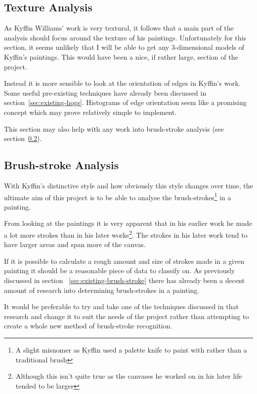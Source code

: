 \subsection{Texture Analysis}
As Kyffin Williams' work is very textural, it follows that a main part of the analysis should
focus around the texture of his paintings. Unfortunately for this section, it seems unlikely that
I will be able to get any 3-dimensional models of Kyffin's paintings. This would have been a nice,
if rather large, section of the project.

Instead it is more sensible to look at the orientation of edges in Kyffin's work. Some useful 
pre-existing techniques have already been discussed in section~\ref{sec:existing-hogs}. Histograms
of edge orientation\cite{Dalal2005Histograms} seem like a promising concept which may prove 
relatively simple to implement.

This section may also help with any work into brush-stroke analysis (see 
section~\ref{sec:analysis-brush-stroke}).

\subsection{Brush-stroke Analysis}\label{sec:analysis-brush-stroke}
With Kyffin's distinctive style and how obviously this style changes over time, the ultimate aim 
of this project is to be able to analyse the brush-strokes\footnote{A slight misnomer as Kyffin 
used a palette knife to paint with rather than a traditional brush} in a painting.

From looking at the paintings it is very apparent that in his earlier work he made a lot more 
strokes than in his later works\footnote{Although this isn't quite true as the canvases he worked
on in his later life tended to be larger}. The strokes in his later work tend to have larger areas
and span more of the canvas.

If it is possible to calculate a rough amount and size of strokes made in a given painting it 
should be a reasonable piece of data to classify on. As previously discussed in section~
\ref{sec:existing-brush-stroke} there has already been a decent amount of research into determining
brush-strokes in a painting. 

It would be preferable to try and take one of the techniques discussed in that research and change
it to suit the needs of the project rather than attempting to create a whole new method of 
brush-stroke recognition.

